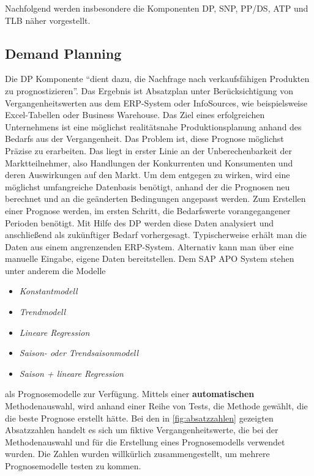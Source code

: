 Nachfolgend werden insbesondere die Komponenten \ac{DP}, \ac{SNP}, \ac{PP/DS}, \ac{ATP} und \ac{TLB} näher vorgestellt.

\subsection{Demand Planning}
Die \ac{DP} Komponente "`dient dazu, die Nachfrage nach verkaufsfähigen Produkten zu prognostizieren"'\cite[Abschnitt 4, Seite 12]{scm:script_17_1}. Das Ergebnis ist Absatzplan unter Berücksichtigung von Vergangenheitswerten aus dem \ac{ERP}-System oder InfoSources, wie beispielsweise Excel-Tabellen oder Business Warehouse.
Das Ziel eines erfolgreichen Unternehmens ist eine möglichst realitätsnahe Produktionsplanung anhand des Bedarfs aus der Vergangenheit. Das Problem ist, diese Prognose möglichst Präzise zu erarbeiten. Das liegt in erster Linie an der Unberechenbarkeit der Marktteilnehmer, also Handlungen der Konkurrenten und Konsumenten und deren Auswirkungen auf den Markt. Um dem entgegen zu wirken, wird eine möglichst umfangreiche Datenbasis benötigt, anhand der die Prognosen neu berechnet und an die geänderten Bedingungen angepasst werden. 
Zum Erstellen einer Prognose werden, im ersten Schritt, die Bedarfswerte vorangegangener Perioden benötigt. Mit Hilfe des \ac{DP} werden diese Daten analysiert und anschließend als zukünftiger Bedarf vorhergesagt. Typischerweise erhält man die Daten aus einem angrenzenden \ac{ERP}-System. Alternativ kann man über eine manuelle Eingabe, eigene Daten bereitstellen. Dem SAP \ac{APO} System stehen unter anderem die Modelle
\begin{itemize}
	\item \textit{Konstantmodell}
	\item \textit{Trendmodell}
	\item \textit{Lineare Regression }
	\item \textit{Saison- oder Trendsaisonmodell}
	\item \textit{Saison + lineare Regression}
\end{itemize}
als Prognosemodelle zur Verfügung. Mittels einer \textbf{automatischen} Methodenauswahl, wird anhand einer Reihe von Tests, die Methode gewählt, die die beste Prognose erstellt hätte. \cite[Abschnitt 4, Seite 14]{scm:script_17_1}
Bei den in \ref{fig:absatzzahlen} gezeigten Absatzzahlen handelt es sich um fiktive Vergangenheitswerte, die bei der Methodenauswahl und für die Erstellung eines Prognosemodells verwendet wurden. Die Zahlen wurden willkürlich zusammengestellt, um mehrere Prognosemodelle testen zu kommen. 
